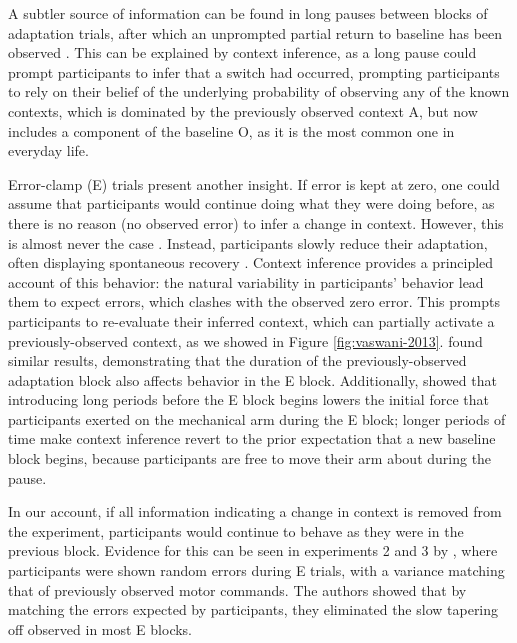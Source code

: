 \documentclass[a4paper,doc,floatsintext,natbib]{apa6}
\def \fref #1{Figure \ref{#1}}     %
\begin{document}
A subtler source of information can be found in long pauses between blocks of adaptation trials, after which an unprompted partial return to baseline has been observed \cite{Ethier_Spontaneous_2008}. This can be explained by context inference, as a long pause could prompt participants to infer that a switch had occurred, prompting participants to rely on their belief of the underlying probability of observing any of the known contexts, which is dominated by the previously observed context A, but now includes a component of the baseline O, as it is the most common one in everyday life.

Error-clamp (E) trials present another insight. If error is kept at zero, one could assume that participants would continue doing what they were doing before, as there is no reason (no observed error) to infer a change in context. However, this is almost never the case \cite[e.g.][]{Smith_Interacting_2006,Ethier_Spontaneous_2008,Forano_Timescales_2020,Vaswani_Decay_2013,Scheidt_Persistence_2000,Pekny_Protection_2011}. Instead, participants slowly reduce their adaptation, often displaying spontaneous recovery \cite[e.g.][]{Smith_Interacting_2006}. Context inference provides a principled account of this behavior: the natural variability in participants' behavior lead them to expect errors, which clashes with the observed zero error. This prompts participants to re-evaluate their inferred context, which can partially activate a previously-observed context, as we showed in \fref{fig:vaswani-2013}. \cite{Pekny_Protection_2011} found similar results, demonstrating that the duration of the previously-observed adaptation block also affects behavior in the E block. Additionally, \cite{Criscimagna-Hemminger_Consolidation_2008} showed that introducing long periods before the E block begins lowers the initial force that participants exerted on the mechanical arm during the E block; longer periods of time make context inference revert to the prior expectation that a new baseline block begins, because participants are free to move their arm about during the pause.

In our account, if all information indicating a change in context is removed from the experiment, participants would continue to behave as they were in the previous block. Evidence for this can be seen in experiments 2 and 3 by \cite{Vaswani_Decay_2013}, where participants were shown random errors during E trials, with a variance matching that of previously observed motor commands. The authors showed that by matching the errors expected by participants, they eliminated the slow tapering off observed in most E blocks.
\end{document}
